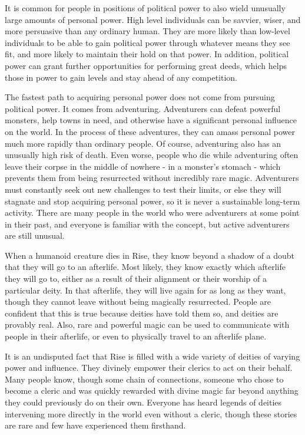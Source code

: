  It is common for people in positions of political power to also wield unusually large amounts of personal power.
  High level individuals can be savvier, wiser, and more persuasive than any ordinary human.
  They are more likely than low-level individuals to be able to gain political power through whatever means they see fit, and more likely to maintain their hold on that power.
  In addition, political power can grant further opportunities for performing great deeds, which helps those in power to gain levels and stay ahead of any competition.

  The fastest path to acquiring personal power does not come from pursuing political power.
  It comes from adventuring.
  Adventurers can defeat powerful monsters, help towns in need, and otherwise have a significant personal influence on the world.
  In the process of these adventures, they can amass personal power much more rapidly than ordinary people.
  Of course, adventuring also has an unusually high risk of death.
  Even worse, people who die while adventuring often leave their corpse in the middle of nowhere - in a monster's stomach - which prevents them from being resurrected without incredibly rare magic.
  Adventurers must constantly seek out new challenges to test their limits, or else they will stagnate and stop acquiring personal power, so it is never a sustainable long-term activity.
  There are many people in the world who were adventurers at some point in their past, and everyone is familiar with the concept, but active adventurers are still unusual.


  When a humanoid creature dies in Rise, they know beyond a shadow of a doubt that they will go to an afterlife.
  Most likely, they know exactly which afterlife they will go to, either as a result of their alignment or their worship of a particular deity.
  In that afterlife, they will live again for as long as they want, though they cannot leave without being magically resurrected.
  People are confident that this is true because deities have told them so, and deities are provably real.
  Also, rare and powerful magic can be used to communicate with people in their afterlife, or even to physically travel to an afterlife plane.

  It is an undisputed fact that Rise is filled with a wide variety of deities of varying power and influence.
  They divinely empower their clerics to act on their behalf.
  Many people know, though some chain of connections, someone who chose to become a cleric and was quickly rewarded with divine magic far beyond anything they could previously do on their own.
  Everyone has heard legends of deities intervening more directly in the world even without a cleric, though these stories are rare and few have experienced them firsthand.

